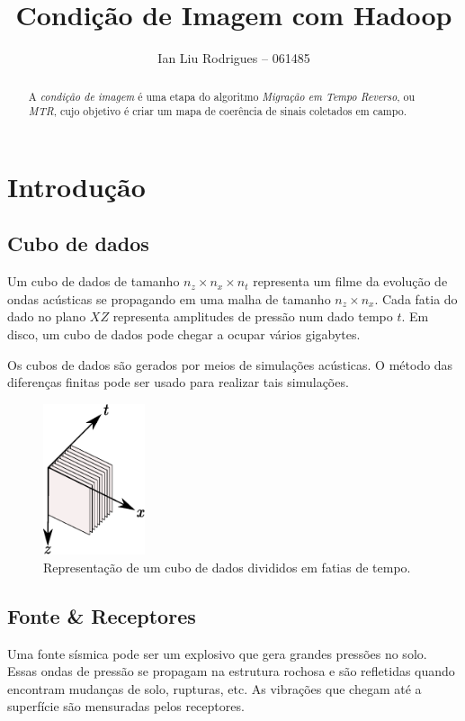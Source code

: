 \documentclass[a4paper,12pt]{article}
\begin{document}
\title{Condição de Imagem com Hadoop}
\author{Ian Liu Rodrigues -- 061485}
\maketitle

\begin{abstract}
  A \emph{condição de imagem} é uma etapa do algoritmo \emph{Migração em
  Tempo Reverso}, ou \emph{MTR}, cujo objetivo é criar um mapa de
  coerência de sinais coletados em campo.
\end{abstract}

\section{Introdução}

\subsection{Cubo de dados}

Um cubo de dados de tamanho $n_z \times n_x \times n_t$ representa um
filme da evolução de ondas acústicas se propagando em uma malha de
tamanho $n_z \times n_x$. Cada fatia do dado no plano $XZ$ representa
amplitudes de pressão num dado tempo $t$. Em disco, um cubo de dados
pode chegar a ocupar vários gigabytes.

Os cubos de dados são gerados por meios de simulações acústicas. O
método das diferenças finitas pode ser usado para realizar tais
simulações.

\begin{figure}
  \centering
  \includegraphics[width=3cm]{images/cubo-de-dados}
  \caption{Representação de um cubo de dados divididos em fatias de
  tempo.}
\end{figure}

\subsection{Fonte \& Receptores}

Uma fonte sísmica pode ser um explosivo que gera grandes pressões no
solo. Essas ondas de pressão se propagam na estrutura rochosa e são
refletidas quando encontram mudanças de solo, rupturas, etc. As
vibrações que chegam até a superfície são mensuradas pelos receptores.
\end{document}
